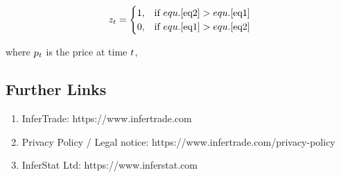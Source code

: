 \documentclass{article}
\begin{document}
\[ z_t = \begin{cases} \mbox{1,} & \mbox{if } equ.\ref{eq2}>equ.\ref{eq1} \\ \mbox{0,} & \mbox{if } equ.\ref{eq1}>equ.\ref{eq2} \end{cases} \]


\hspace{200mm}

where $p_t$ is the price at time $t$,

\hspace{200mm}
\hspace{200mm}

\subsection*{Further Links}

\begin{enumerate}
    \item InferTrade: https://www.infertrade.com
    \item Privacy Policy / Legal notice: https://www.infertrade.com/privacy-policy
    \item InferStat Ltd: https://www.inferstat.com
\end{enumerate}
\end{document}
